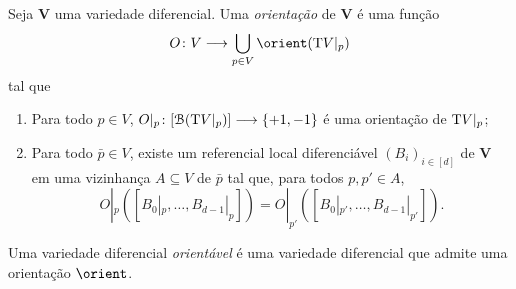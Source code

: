 











\begin{defi}
Seja $\bm V$ uma variedade diferencial. Uma \emph{orientação} de $\bm V$ é uma função
	\begin{equation*}
	O \colon V \to \bigcup_{p \in V} \orient(\Tg V|_p)
	\end{equation*}
tal que
	\begin{enumerate}
	\item Para todo $p \in V$, $O|_p\colon [\mathcal{B}(\mathrm{T} V|_p)] \longrightarrow \{+1,-1\}$ é uma orientação de $\mathrm{T} V|_p$;
	\item Para todo $\bar p \in V$, existe um referencial local diferenciável $(B_i)_{i \in [d]}$ de $\bm V$ em uma vizinhança $A \subseteq V$ de $\bar p$ tal que, para todos $p,p' \in A$,
	\begin{equation*}
	O|_p([B_0|_p,\ldots,B_{d-1}|_p]) = O|_{p'}([B_0|_{p'},\ldots,B_{d-1}|_{p'}]).
	\end{equation*}
	\end{enumerate}

Uma variedade diferencial \emph{orientável} é uma variedade diferencial que admite uma orientação $\orient$.
\end{defi}

